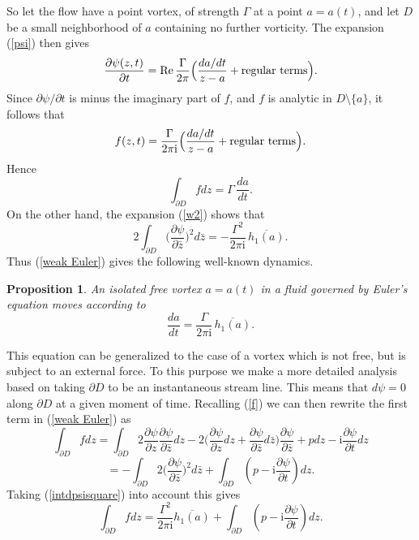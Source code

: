 \documentclass[reqno,12pt]{article}
\theoremstyle{plain}
\newtheorem{proposition}[thm]{Proposition}
\theoremstyle{definition}
\numberwithin{equation}{section}
\numberwithin{figure}{section}
\DeclareMathOperator{\re}{Re}
\def\I{\mathrm{i}}
\begin{document}
So let the flow have  a point vortex, of strength $\Gamma$ at a point $a=a(t)$, and let $D$
be a small neighborhood of $a$ containing no further vorticity. The expansion (\ref{psi}) then gives
\begin{equation}\label{dpsidt} 
\frac{\partial\psi(z,t)}{\partial t}
=\re\frac{\Gamma}{2\pi} \Big(\frac{d{a}/dt}{z-a}+ {\rm regular\ terms}\Big).
\end{equation}
Since $\partial{\psi}/\partial t$ is minus the imaginary part of $f$, and $f$ is analytic in $D\setminus\{a\}$,
it follows that
$$
f(z,t)=\frac{\Gamma}{2\pi\I} \Big(\frac{d{a}/dt}{z-a}+ {\rm regular\ terms}\Big).
$$
Hence
\begin{equation}\label{intfdz}
\int_{\partial D}fdz=\Gamma\,\frac{d a}{dt}.
\end{equation}
On the other hand, the expansion (\ref{w2}) shows that
\begin{equation}\label{intdpsisquare}
2\int_{\partial D}\big(\frac{\partial \psi}{\partial \bar{z}}\big)^2d\bar{z}
=-\frac{\Gamma^2}{2\pi\I}\,\overline{h_1(a)}.
\end{equation}
Thus (\ref{weak Euler}) gives the following well-known dynamics.
\begin{proposition}
An isolated free vortex $a=a(t)$ in a fluid governed by Euler's equation
moves according to 
\begin{equation}\label{dynamics}
 \frac{da}{d t}=\frac{\Gamma}{2\pi\I}\,\overline{h_1(a)}.
\end{equation}
\end{proposition}

This equation can be generalized to the case of a  vortex which is not free, but is subject to an external force.
To this purpose we make a more detailed analysis based on taking $\partial D$ to be an 
instantaneous stream line. This means that  
$d\psi=0$ along $\partial D$ at a given moment of time. Recalling (\ref{f}) we can then rewrite the first term in (\ref{weak Euler}) as
$$
\int_{\partial D}fdz
=\int_{\partial D}2\frac{\partial \psi}{\partial {z}}
\frac{\partial \psi}{\partial \bar{z}}dz-2
\Big(\frac{\partial \psi}{\partial z}dz+\frac{\partial \psi}{\partial \bar{z}}d\bar{z}\Big)\frac{\partial \psi}{\partial \bar{z}}
+p dz-\I\frac{\partial \psi}{\partial t}dz
$$
$$
=-\int_{\partial D}2\big(\frac{\partial \psi}{\partial \bar{z}}\big)^2d\bar{z}+\int_{\partial D}(p-\I\frac{\partial \psi}{\partial t})dz.
$$
Taking (\ref{intdpsisquare}) into account this gives
\begin{equation}\label{three terms}
\int_{\partial D}fdz=\frac{\Gamma^2}{2\pi\I}\overline{h_1(a)}+\int_{\partial D}(p-\I\frac{\partial \psi}{\partial t})dz.
\end{equation} 
\end{document}

